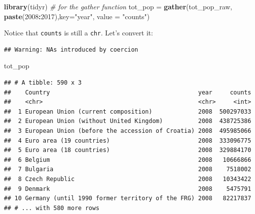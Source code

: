 \documentclass[]{book}
\newenvironment{Shaded}{\begin{snugshade}}{\end{snugshade}}
\newcommand{\KeywordTok}[1]{\textcolor[rgb]{0.13,0.29,0.53}{\textbf{#1}}}
\newcommand{\DataTypeTok}[1]{\textcolor[rgb]{0.13,0.29,0.53}{#1}}
\newcommand{\DecValTok}[1]{\textcolor[rgb]{0.00,0.00,0.81}{#1}}
\newcommand{\StringTok}[1]{\textcolor[rgb]{0.31,0.60,0.02}{#1}}
\newcommand{\CommentTok}[1]{\textcolor[rgb]{0.56,0.35,0.01}{\textit{#1}}}
\newcommand{\OperatorTok}[1]{\textcolor[rgb]{0.81,0.36,0.00}{\textbf{#1}}}
\newcommand{\NormalTok}[1]{#1}
\theoremstyle{definition}
\theoremstyle{definition}
\theoremstyle{definition}
\theoremstyle{remark}
\begin{document}
\begin{Shaded}
\begin{Highlighting}[]
\KeywordTok{library}\NormalTok{(tidyr)   }\CommentTok{# for the gather function}
\NormalTok{tot_pop =}\StringTok{ }\KeywordTok{gather}\NormalTok{(tot_pop_raw, }\KeywordTok{paste}\NormalTok{(}\DecValTok{2008}\OperatorTok{:}\DecValTok{2017}\NormalTok{),}\DataTypeTok{key=}\StringTok{"year"}\NormalTok{, }\DataTypeTok{value =} \StringTok{"counts"}\NormalTok{)}
\end{Highlighting}
\end{Shaded}

Notice that \texttt{counts} is still a \texttt{chr}. Let's convert it:

\begin{Shaded}
\end{Shaded}

\begin{verbatim}
## Warning: NAs introduced by coercion
\end{verbatim}

\begin{Shaded}
\begin{Highlighting}[]
\NormalTok{tot_pop}
\end{Highlighting}
\end{Shaded}

\begin{verbatim}
## # A tibble: 590 x 3
##    Country                                          year     counts
##    <chr>                                            <chr>     <int>
##  1 European Union (current composition)             2008  500297033
##  2 European Union (without United Kingdom)          2008  438725386
##  3 European Union (before the accession of Croatia) 2008  495985066
##  4 Euro area (19 countries)                         2008  333096775
##  5 Euro area (18 countries)                         2008  329884170
##  6 Belgium                                          2008   10666866
##  7 Bulgaria                                         2008    7518002
##  8 Czech Republic                                   2008   10343422
##  9 Denmark                                          2008    5475791
## 10 Germany (until 1990 former territory of the FRG) 2008   82217837
## # ... with 580 more rows
\end{verbatim}
\end{document}
